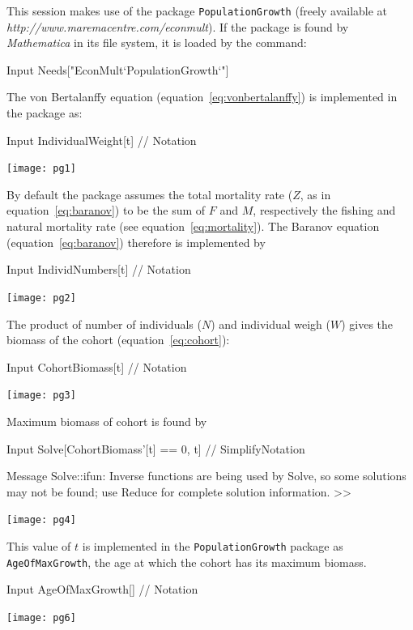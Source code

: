 \documentclass[11pt,fleqn]{book} %
\begin{document}
\begin{theorem}
\hfill \break 
This session makes use of the package \texttt{PopulationGrowth} (freely available at \\ \textit{http://www.maremacentre.com/econmult}). If the package is found by \textit{Mathematica} in its file system, it is loaded by the command:
\begin{mmaCell}[index=1]{Input}
  Needs["EconMult`PopulationGrowth`"]
\end{mmaCell}
The von Bertalanffy equation (equation~\ref{eq:vonbertalanffy}) is implemented in the package as:
\begin{flushleft}
\begin{mmaCell}{Input}
  IndividualWeight[t] // Notation
\end{mmaCell}
\texttt{[image: pg1]}

By default the package assumes the total mortality rate ($Z$, as in equation~\ref{eq:baranov}) to be the sum of $F$ and $M$, respectively the fishing and natural mortality rate (see equation~\ref{eq:mortality}). The Baranov equation (equation~\ref{eq:baranov}) therefore is implemented by
\begin{mmaCell}{Input}
  IndividNumbers[t] // Notation
\end{mmaCell}
\texttt{[image: pg2]}

The product of number of individuals ($N$) and individual weigh ($W$) gives the biomass of the cohort (equation~\ref{eq:cohort}):
\begin{mmaCell}{Input}
  CohortBiomass[t] // Notation
\end{mmaCell}
\texttt{[image: pg3]}

Maximum biomass of cohort is found by
\begin{mmaCell}{Input}
  Solve[CohortBiomass'[t] == 0, t] // SimplifyNotation
\end{mmaCell}
\begin{mmaCell}[messagelink=message/General/infy]{Message}
  Solve::ifun: Inverse functions are being used by Solve, so some solutions may 
  not be found; use Reduce for complete solution information. >>
\end{mmaCell}
\texttt{[image: pg4]}

This value of $t$ is implemented in the \texttt{PopulationGrowth} package as \texttt{AgeOfMaxGrowth}, the age at which the cohort has its maximum biomass.
\begin{mmaCell}{Input}
  AgeOfMaxGrowth[] // Notation
\end{mmaCell}
\texttt{[image: pg6]}


\end{flushleft}
\end{theorem}
\end{document}
